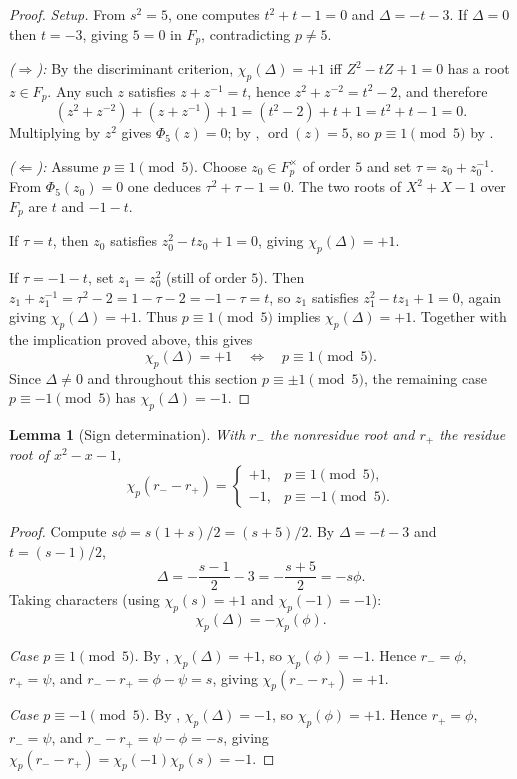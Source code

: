 \documentclass[preprint,5p,times,twocolumn]{elsarticle}
\def\F{F}\def\Z{Z}\def\Q{Q}\def\R{R}\def\N{N}%
\newtheorem{lemma}[theorem]{Lemma}
\DeclareMathOperator{\ord}{ord}
\newcommand{\Z}{\mathbb{Z}}
\newcommand{\Q}{\mathbb{Q}}
\newcommand{\R}{\mathbb{R}}
\newcommand{\F}{\mathbb{F}}
\newcommand{\N}{\mathbb{N}}
\begin{document}
\begin{proof}
\emph{Setup.} From $s^2=5$, one computes $t^2+t-1=0$ and 
$\Delta=-t-3$. If $\Delta=0$ then $t=-3$, giving $5=0$ in 
$\F_p$, contradicting $p\ne5$.

\emph{($\Rightarrow$):} By the discriminant criterion, 
$\chi_p(\Delta)=+1$ iff $Z^2-tZ+1=0$ has a root $z\in\F_p$. 
Any such $z$ satisfies $z+z^{-1}=t$, hence $z^2+z^{-2}=t^2-2$, 
and therefore
\[
(z^2+z^{-2})+(z+z^{-1})+1=(t^2-2)+t+1=t^2+t-1=0.
\]
Multiplying by $z^2$ gives $\Phi_5(z)=0$; by 
, $\ord(z)=5$, so $p\equiv1\pmod5$ by 
.

\emph{($\Leftarrow$):} Assume $p\equiv1\pmod5$. Choose 
$z_0\in\F_p^\times$ of order $5$ and set $\tau=z_0+z_0^{-1}$. 
From $\Phi_5(z_0)=0$ one deduces $\tau^2+\tau-1=0$. The two 
roots of $X^2+X-1$ over $\F_p$ are $t$ and $-1-t$.

If $\tau=t$, then $z_0$ satisfies $z_0^2-tz_0+1=0$, giving 
$\chi_p(\Delta)=+1$.

If $\tau=-1-t$, set $z_1=z_0^2$ (still of order $5$). Then 
$z_1+z_1^{-1}=\tau^2-2=1-\tau-2=-1-\tau=t$, so $z_1$ satisfies 
$z_1^2-tz_1+1=0$, again giving $\chi_p(\Delta)=+1$.
Thus \(p\equiv1\pmod5\) implies \(\chi_p(\Delta)=+1\). Together
with the implication proved above, this gives
\[
\chi_p(\Delta)=+1 \quad\Longleftrightarrow\quad p\equiv1\pmod5.
\]
Since \(\Delta\ne0\) and throughout this section
\(p\equiv\pm1\pmod5\), the remaining case \(p\equiv-1\pmod5\)
has \(\chi_p(\Delta)=-1\).
\end{proof}

\begin{lemma}[Sign determination]\label{lem:R3}
With $r_-$ the nonresidue root and $r_+$ the residue root of 
$x^2-x-1$,
\[
\chi_p(r_- - r_+)=
\begin{cases}+1,& p\equiv 1\pmod 5,\\
              -1,& p\equiv -1\pmod 5.\end{cases}
\]
\end{lemma}

\begin{proof}
Compute $s\phi=s(1+s)/2=(s+5)/2$. By $\Delta=-t-3$ and 
$t=(s-1)/2$,
\[
\Delta=-\frac{s-1}{2}-3=-\frac{s+5}{2}=-s\phi.
\]
Taking characters (using $\chi_p(s)=+1$ and $\chi_p(-1)=-1$):
\[
\chi_p(\Delta)=-\chi_p(\phi).
\]

\emph{Case $p\equiv1\pmod5$.} By , 
$\chi_p(\Delta)=+1$, so $\chi_p(\phi)=-1$. Hence $r_-=\phi$, 
$r_+=\psi$, and $r_- - r_+=\phi-\psi=s$, giving 
$\chi_p(r_- - r_+)=+1$.

\emph{Case $p\equiv-1\pmod5$.} By , 
$\chi_p(\Delta)=-1$, so $\chi_p(\phi)=+1$. Hence $r_+=\phi$, 
$r_-=\psi$, and $r_- - r_+=\psi-\phi=-s$, giving 
$\chi_p(r_- - r_+)=\chi_p(-1)\chi_p(s)=-1$.
\end{proof}
\end{document}

